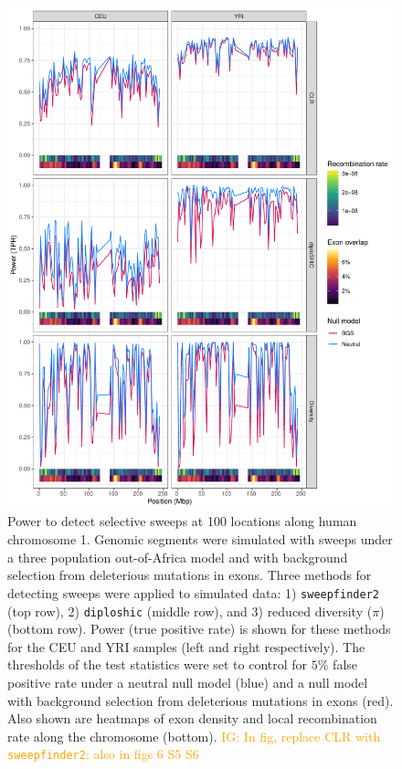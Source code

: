 \documentclass[hidelinks]{article}
\newcommand{\sweepfinder}{\texttt{sweepfinder2}\xspace}
\newcommand{\diploshic}{\texttt{diploshic}\xspace}
\newcommand{\igcomment}[1]{\textcolor{orange}{IG: #1}}
\begin{document}
    \begin{figure}[t!]
        \centering
        \includegraphics[width=0.8 \textwidth]{figures/sweeps/chr1_power.pdf}
        \caption{
        Power to detect selective sweeps at 100 locations along human
        chromosome 1. Genomic segments were simulated with sweeps under a three population out-of-Africa model
        \citep{gutenkunst2009inferring} and with background selection from deleterious mutations in exons.
        Three methods for detecting sweeps were applied to simulated data:
        1) \sweepfinder \citep{degiorgio2016sweepfinder2} (top row),
        2) \diploshic \citep{kern2018diplos} (middle row),
        and 3) reduced diversity ($\pi$) (bottom row).
        Power (true positive rate) is shown for these methods for the CEU and YRI
        samples (left and right respectively).
        The thresholds of the test statistics were set to control for
        $5\%$ false positive rate under a neutral null model (blue)
        and a null model with background selection from deleterious mutations in exons (red).
        Also shown are heatmaps of exon density and local recombination rate along the
        chromosome (bottom).
        \igcomment{In fig, replace CLR with \sweepfinder; also in figs 6 S5 S6}
        }
        \label{fig:chr1_power}
    \end{figure}
   
\end{document}
